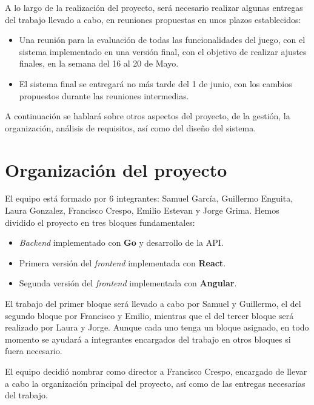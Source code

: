 \documentclass[11pt, a4paper, titlepage]{article}
\begin{document}
A lo largo de la realización del proyecto, será necesario realizar algunas entregas del trabajo llevado a cabo, en reuniones propuestas en unos plazos establecidos:

\begin{itemize}
    \item Una reunión para la evaluación de todas las funcionalidades del juego, con el sistema implementado en una versión final, con el objetivo de realizar ajustes finales, en la semana del 16 al 20 de Mayo.
    \item El sistema final se entregará no más tarde del 1 de junio, con los cambios propuestos durante las reuniones intermedias.
\end{itemize}

A continuación se hablará sobre otros aspectos del proyecto, de la gestión, la organización, análisis de requisitos, así como del diseño del sistema.

\section{Organización del proyecto}
El equipo está formado por 6 integrantes: Samuel García, Guillermo Enguita, Laura Gonzalez, Francisco Crespo, Emilio Estevan y Jorge Grima.
Hemos dividido el proyecto en tres bloques fundamentales:\newline
\begin{itemize}
    \item \textit{Backend} implementado con \textbf{Go} y desarrollo de la API.
    \item Primera versión del \textit{frontend} implementada con \textbf{React}.
    \item Segunda versión del \textit{frontend} implementada con \textbf{Angular}.\newline
\end{itemize}

El trabajo del primer bloque será llevado a cabo por Samuel y Guillermo, el del segundo bloque por Francisco y Emilio, mientras que el del tercer bloque será realizado por Laura y Jorge. 
Aunque cada uno tenga un bloque asignado, en todo momento se ayudará a integrantes encargados del trabajo en otros bloques si fuera necesario. \newline

El equipo decidió nombrar como director a Francisco Crespo, encargado de llevar a cabo la organización principal del proyecto, así como de las entregas necesarias del trabajo.\newline
\end{document}
